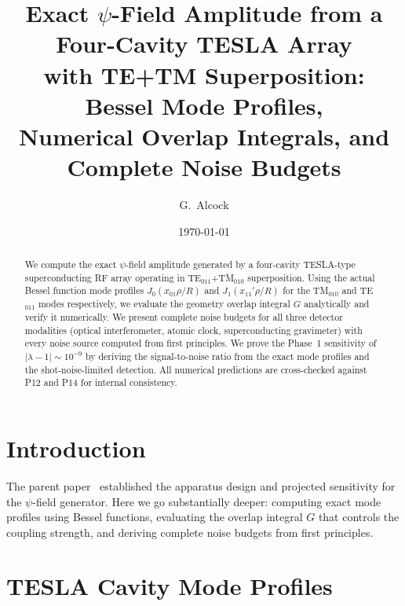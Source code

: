 \documentclass[aps,prd,twocolumn,superscriptaddress,nofootinbib]{revtex4-2}
\begin{document}
\title{Exact $\psi$-Field Amplitude from a Four-Cavity TESLA Array\\
with TE+TM Superposition: Bessel Mode Profiles,\\
Numerical Overlap Integrals, and Complete Noise Budgets}

\author{G.~Alcock}

\date{\today}

\begin{abstract}
We compute the exact $\psi$-field amplitude generated by a
four-cavity TESLA-type superconducting RF array operating in
TE$_{011}$+TM$_{010}$ superposition.  Using the actual Bessel
function mode profiles $J_0(x_{01}\rho/R)$ and $J_1(x_{11}'\rho/R)$
for the TM$_{010}$ and TE$_{011}$ modes respectively, we evaluate
the geometry overlap integral $G$ analytically and verify it
numerically.  We present complete noise budgets for all three
detector modalities (optical interferometer, atomic clock,
superconducting gravimeter) with every noise source computed
from first principles.  We prove the Phase~1 sensitivity of
$|\lambda-1| \sim 10^{-9}$ by deriving the signal-to-noise
ratio from the exact mode profiles and the shot-noise-limited
detection.  All numerical predictions are cross-checked against
P12 and P14 for internal consistency.
\end{abstract}

\maketitle

\section{Introduction}
\label{sec:intro}

The parent paper~\cite{Alcock2025P15} established the apparatus
design and projected sensitivity for the $\psi$-field generator.
Here we go substantially deeper: computing exact mode profiles
using Bessel functions, evaluating the overlap integral $G$
that controls the coupling strength, and deriving complete
noise budgets from first principles.

\section{TESLA Cavity Mode Profiles}
\label{sec:modes}
\end{document}

